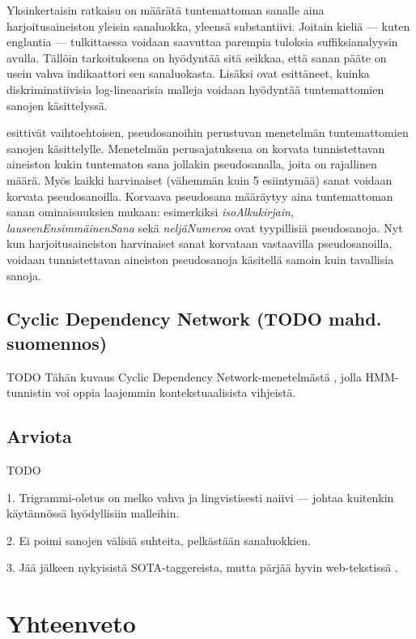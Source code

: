 \documentclass[utf8,bachelor,manualbib]{gradu3}
\begin{document}
Yksinkertaisin ratkaisu on määrätä tuntemattoman sanalle aina harjoitusaineiston yleisin sanaluokka, yleensä substantiivi. Joitain kieliä --- kuten englantia --- tulkittaessa voidaan saavuttaa parempia tuloksia suffiksianalyysin \citep{samuelsson1993} avulla. Tällöin tarkoituksena on hyödyntää sitä seikkaa, että sanan pääte on usein vahva indikaattori sen sanaluokasta. Lisäksi \citet{toutanova2003} ovat esittäneet, kuinka diskriminatiivisia log-lineaarisia malleja voidaan hyödyntää tuntemattomien sanojen käsittelyssä.

\citet{bikel1999} esittivät vaihtoehtoisen, pseudosanoihin perustuvan menetelmän tuntemattomien sanojen käsittelylle. Menetelmän perusajatuksena on korvata tunnistettavan aineiston kukin tuntematon sana jollakin pseudosanalla, joita on rajallinen määrä. Myös kaikki harvinaiset (vähemmän kuin 5 esiintymää) sanat voidaan korvata pseudosanoilla. Korvaava pseudosana määräytyy aina tuntemattoman sanan ominaisuuksien mukaan: esimerkiksi \textit{isoAlkukirjain}, \textit{lauseenEnsimmäinenSana} sekä \textit{neljäNumeroa} ovat tyypillisiä pseudosanoja. Nyt kun harjoitusaineiston harvinaiset sanat korvataan vastaavilla pseudosanoilla, voidaan tunnistettavan aineiston pseudosanoja käsitellä samoin kuin tavallisia sanoja.


\section{Cyclic Dependency Network (TODO mahd. suomennos)}

TODO Tähän kuvaus Cyclic Dependency Network-menetelmästä \citep{heckerman2000, toutanova2003}, jolla HMM-tunnistin voi oppia laajemmin kontekstuaalisista vihjeistä.

\section{Arviota}

TODO

1. Trigrammi-oletus on melko vahva ja lingvistisesti naiivi --- johtaa kuitenkin käytännössä hyödyllisiin malleihin.

2. Ei poimi sanojen välisiä suhteita, pelkästään sanaluokkien.

3. Jää jälkeen nykyisistä SOTA-taggereista, mutta pärjää hyvin web-tekstissä \citep{giesbrecht2009}.

\chapter{Yhteenveto}
\end{document}
